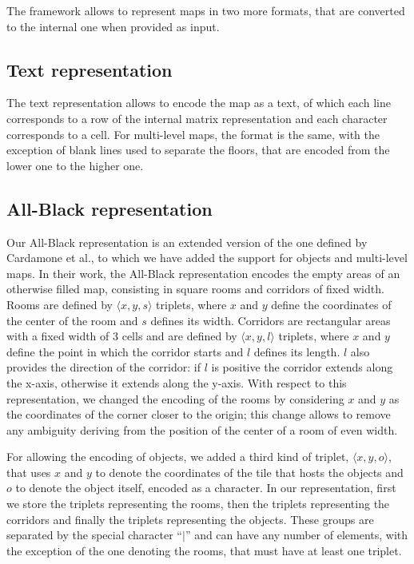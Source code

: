 \par

The framework allows to represent maps in two more formats, that are converted to the internal one when provided as input.


\subsection{Text representation}

The text representation allows to encode the map as a text, of which each line corresponds to a row of the internal matrix representation and each character corresponds to a cell. For multi-level maps, the format is the same, with the exception of blank lines used to separate the floors, that are encoded from the lower one to the higher one.


\subsection{All-Black representation}

Our All-Black representation is an extended version of the one defined by Cardamone et al.\cite{Cardamone:2011:EIM:2008402.2008411}, to which we have added the support for objects and multi-level maps. In their work, the All-Black representation encodes the empty areas of an otherwise filled map, consisting in square rooms and corridors of fixed width. Rooms are defined by $\langle x,y,s \rangle$ triplets, where $x$ and $y$ define the coordinates of the center of the room and $s$ defines its width. Corridors are rectangular areas with a fixed width of $3$ cells and are defined by $\langle x,y,l \rangle$ triplets, where $x$ and $y$ define the point in which the corridor starts and $l$ defines its length. $l$ also provides the direction of the corridor: if $l$ is positive the corridor extends along the x-axis, otherwise it extends along the y-axis. With respect to this representation, we changed the encoding of the rooms by considering $x$ and $y$ as the coordinates of the corner closer to the origin; this change allows to remove any ambiguity deriving from the position of the center of a room of even width.

\par

For allowing the encoding of objects, we added a third kind of triplet, $\langle x,y,o \rangle$, that uses $x$ and $y$ to denote the coordinates of the tile that hosts the objects and $o$ to denote the object itself, encoded as a character. In our representation, first we store the triplets representing the rooms, then the triplets representing the corridors and finally the triplets representing the objects. These groups are separated by the special character ``$\mid$'' and can have any number of elements, with the exception of the one denoting the rooms, that must have at least one triplet.

